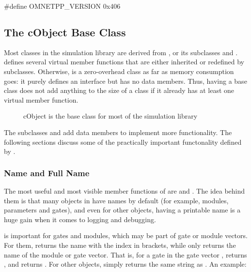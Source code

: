 \begin{cpp}
#define OMNETPP_VERSION 0x406
\end{cpp}


\subsection{The cObject Base Class}
\label{sec:sim-lib:cobject}

Most classes in the simulation library are derived from ,
or its subclasses  and .
 defines several virtual member functions that are either
inherited or redefined by subclasses. Otherwise,  is a
zero-overhead class as far as memory consumption goes: it purely defines an
interface but has no data members. Thus, having  a base
class does not add anything to the size of a class if it already has at
least one virtual member function.

\begin{figure}[htbp]
  \begin{center}
    
    \caption{cObject is the base class for most of the simulation library}
  \end{center}
\end{figure}

The subclasses  and  add data
members to implement more functionality. The following sections discuss
some of the practically important functonality defined by .


\subsubsection{Name and Full Name}
\label{sec:sim-lib:object-name}

The most useful and most visible member functions of  are
 and . The idea behind them is that
many objects in {\opp} have names by default (for example, modules,
parameters and gates), and even for other objects, having a printable name
is a huge gain when it comes to logging and debugging.

 is important for gates and modules, which may be part
of gate or module vectors. For them,  returns the name
with the index in brackets, while  only returns the name
of the module or gate vector. That is, for a gate  in the gate
vector ,  returns , and
 returns . For other objects,
 simply returns the same string as .
An example:


